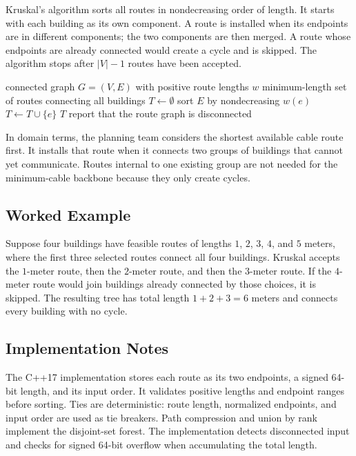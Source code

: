 \documentclass[conference]{IEEEtran}
\begin{document}
Kruskal's algorithm sorts all routes in nondecreasing order of length. It
starts with each building as its own component. A route is installed when its
endpoints are in different components; the two components are then merged. A
route whose endpoints are already connected would create a cycle and is
skipped. The algorithm stops after $|V|-1$ routes have been accepted.

\begin{algorithm}[t]
\caption{Kruskal minimum-cable network}
\label{alg:kruskal}
\begin{algorithmic}[1]
\Require connected graph $G=(V,E)$ with positive route lengths $w$
\Ensure minimum-length set of routes connecting all buildings
\State $T\gets\emptyset$
  \State {}
\EndFor
\State sort $E$ by nondecreasing $w(e)$
    \State $T\gets T\cup\{e\}$
    \State {}
      \State \Return $T$
    \EndIf
  \EndIf
\EndFor
\State report that the route graph is disconnected
\end{algorithmic}
\end{algorithm}

In domain terms, the planning team considers the shortest available cable
route first. It installs that route when it connects two groups of buildings
that cannot yet communicate. Routes internal to one existing group are not
needed for the minimum-cable backbone because they only create cycles.

\subsection{Worked Example}

Suppose four buildings have feasible routes of lengths $1$, $2$, $3$, $4$,
and $5$ meters, where the first three selected routes connect all four
buildings. Kruskal accepts the $1$-meter route, then the $2$-meter route, and
then the $3$-meter route. If the $4$-meter route would join buildings already
connected by those choices, it is skipped. The resulting tree has total length
$1+2+3=6$ meters and connects every building with no cycle.

\subsection{Implementation Notes}

The C++17 implementation stores each route as its two endpoints, a signed
64-bit length, and its input order. It validates positive lengths and endpoint
ranges before sorting. Ties are deterministic: route length, normalized
endpoints, and input order are used as tie breakers. Path compression and
union by rank implement the disjoint-set forest. The implementation detects
disconnected input and checks for signed 64-bit overflow when accumulating the
total length.
\end{document}
